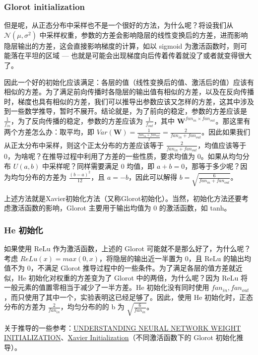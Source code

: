 \subsubsection{Glorot initialization}
但是呢，从正态分布中采样也不是一个很好的方法，为什么呢？将设我们从 $\mathcal{N}(\mu, \sigma^2)$ 中采样权重，参数的方差会影响隐层的线性变换后的方差，进而影响隐层输出的方差，这会直接影响梯度的计算，如以 sigmoid 为激活函数时，则可能落在平坦的区域 --- 也就是可能会出现梯度向后传着传着就没了或者就变得很大了。

因此一个好的初始化应该满足：各层的值（线性变换后的值、激活后的值）应该有相似的方差。为了满足前向传播时各隐层的输出值有相似的方差，以及在反向传播时，梯度也具有相似的方差，我们可以推导出参数应该又怎样的方差，这其中涉及到一些数学推导，暂时不展开。结论就是，为了前向的稳定，参数的方差应该是 $\frac{1}{f_{in}}$，为了反向传播的稳定，参数的方差应该为 $\frac{1}{f_{out}}$，其中 $\boldsymbol{W}^{fan_{in} \times fan_{out}}$。那这里有两个方差怎么办：取平均，即 $Var(\boldsymbol{W}) = \frac{1}{ \frac{fan_{in} + fan_{out}}{2}}  = \frac{2}{fan_{in} + fan_{out}}$。因此如果我们从正太分布中采样，则这个正太分布的方差应该等于 $\frac{2}{fan_{in} + fan_{out}}$，均值应该等于 0，为啥呢？在推导过程中利用了方差的一些性质，要求均值为 0。如果从均匀分布 $U(a, b)$ 中采样呢？同样需要满足 0 均值，即 $a + b = 0$，那等于多少呢？因为均匀分布的方差为 $\frac{(b - a)^2}{12}$，且 $a = -b$，因此可以解得 $b = \sqrt{\frac{6}{fan_{in} + fan_{out}}}$。

上述方法就是Xavier初始化方法（又称Glorot初始化）。当然，初始化方法还要考虑激活函数的影响，Glorot 主要用于输出均值为 0 的激活函数，如 tanh。

\subsubsection{He 初始化}
如果使用 ReLu 作为激活函数，上述的 Glorot 可能就不是那么好了，为什么呢？考虑 $ReLu(x) = max(0, x)$，将隐层的输出近一半置为 0，且 ReLu 的输出均值不为 0，不满足 Glorot 推导过程中的一些条件。为了满足各层的值方差就近似，He 初始化对权重的方差变为了 Glorot 中的两倍，为什么呢？因为 ReLu 将一般元素的值置零相当于减少了一半方差。He 初始化没有同时使用 $fan_{in}, fan_{out}$，而只使用了其中一个，实验表明这已经足够了。因此，使用 He 初始化时，正态分布的方差为 $\frac{2}{fan_{in}}$，均匀分布的的 b 为 $\sqrt{\frac{6}{fan_{in}}}$。

关于推导的一些参考：\href{https://intoli.com/blog/neural-network-initialization/}{UNDERSTANDING NEURAL NETWORK WEIGHT INITIALIZATION}、\href{https://mnsgrg.com/2017/12/21/xavier-initialization/}{Xavier Initialization}（不同激活函数下的 Glorot 初始化推导）。


